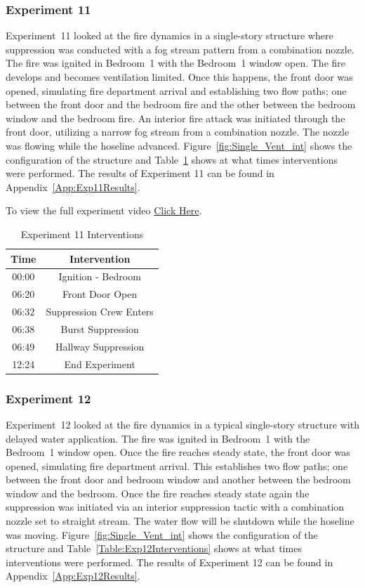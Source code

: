 \documentclass[12pt,oneside]{book}
\begin{document}
\subsubsection{Experiment 11}
Experiment~11 looked at the fire dynamics in a single-story structure where suppression was conducted with a fog stream pattern from a combination nozzle. The fire was ignited in Bedroom~1 with the Bedroom~1 window open. The fire develops and becomes ventilation limited. Once this happens, the front door was opened, simulating fire department arrival and establishing two flow paths; one between the front door and the bedroom fire and the other between the bedroom window and the bedroom fire. An interior fire attack was initiated through the front door, utilizing a narrow fog stream from a combination nozzle. The nozzle was flowing while the hoseline advanced.  Figure~\ref{fig:Single_Vent_int} shows the configuration of the structure and Table~\ref{Table:Exp11Interventions} shows at what times interventions were performed. The results of Experiment 11 can be found in Appendix~\ref{App:Exp11Results}. 

To view the full experiment video \href{https://player.vimeo.com/video/170499614?autoplay=1}{Click Here}.

\begin{table}[H]
	\centering
	\caption{Experiment 11 Interventions}
	\begin{tabular}{|c|c|} 
		\hline
		Time & Intervention \\ \hline \hline
		00:00 & Ignition - Bedroom \\ \hline
		06:20 & Front Door Open \\ \hline
		06:32 & Suppression Crew Enters\\ \hline
		06:38 & Burst Suppression \\ \hline 
		06:49 & Hallway Suppression \\ \hline
		12:24 & End Experiment\\ \hline
	\end{tabular}
	\label{Table:Exp11Interventions}
\end{table}

\FloatBarrier

\subsubsection{Experiment 12}
Experiment~12 looked at the fire dynamics in a typical single-story structure with delayed water application. The fire was ignited in Bedroom~1 with the Bedroom~1 window open. Once the fire reaches steady state, the front door was opened, simulating fire department arrival. This establishes two flow paths; one between the front door and bedroom window and another between the bedroom window and the bedroom. Once the fire reaches steady state again the suppression was initiated via an interior suppression tactic with a combination nozzle set to straight stream. The water flow will be shutdown while the hoseline was moving.  Figure~\ref{fig:Single_Vent_int} shows the configuration of the structure and Table~\ref{Table:Exp12Interventions} shows at what times interventions were performed. The results of Experiment 12 can be found in Appendix~\ref{App:Exp12Results}. 
\end{document}
